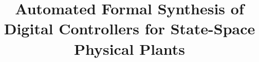 \documentclass[runningheads,a4paper]{llncs}
\begin{document}
\newcommand\tool{{\sf DSSynth}\xspace}

\mainmatter  %

\title{Automated Formal Synthesis of Digital Controllers for State-Space Physical Plants} 


%
%
%


%
%

\institute{}

\maketitle
\end{document}

